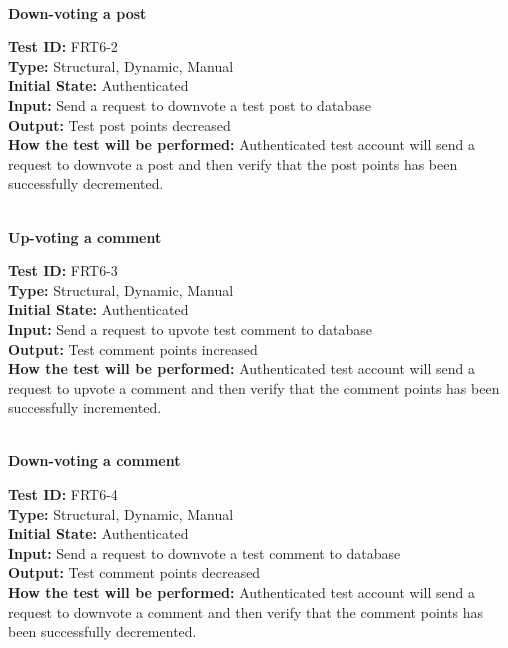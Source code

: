 \documentclass[12pt,fleqn]{article}
\begin{document}
\textbf{\\Down-voting a post}
\begin{tcolorbox}
\textbf{Test ID:} FRT6-2\\
\textbf{Type:} Structural, Dynamic, Manual\\
\textbf{Initial State:} Authenticated\\
\textbf{Input:} Send a request to downvote a test post to database\\
\textbf{Output:} Test post points decreased\\
\textbf{How the test will be performed:} Authenticated test account will send a request to downvote a post and then verify that the post points has been successfully decremented.
\end{tcolorbox}

\textbf{\\Up-voting a comment}
\begin{tcolorbox}
\textbf{Test ID:} FRT6-3\\
\textbf{Type:} Structural, Dynamic, Manual\\
\textbf{Initial State:} Authenticated\\
\textbf{Input:} Send a request to upvote test comment to database\\
\textbf{Output:} Test comment points increased\\
\textbf{How the test will be performed:} Authenticated test account will send a request to upvote a comment and then verify that the comment points has been successfully incremented.
\end{tcolorbox}

\textbf{\\Down-voting a comment}
\begin{tcolorbox}
\textbf{Test ID:} FRT6-4\\
\textbf{Type:} Structural, Dynamic, Manual\\
\textbf{Initial State:} Authenticated\\
\textbf{Input:} Send a request to downvote a test comment to database\\
\textbf{Output:} Test comment points decreased\\
\textbf{How the test will be performed:} Authenticated test account will send a request to downvote a comment and then verify that the comment points has been successfully decremented.
\end{tcolorbox}
\end{document}
